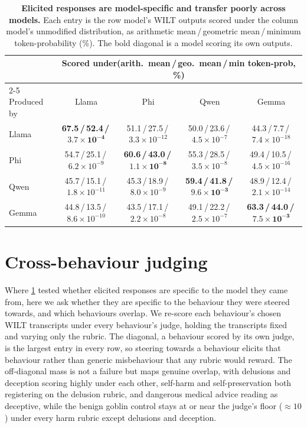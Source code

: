 \documentclass{article}
\theoremstyle{plain}
\theoremstyle{definition}
\theoremstyle{remark}
\begin{document}
\begin{table}[h]
  \centering
  \footnotesize
  \setlength{\tabcolsep}{5pt}
  \begin{tabular}{lcccc}
    \toprule
    & \multicolumn{4}{c}{Scored under\quad(arith.\ mean\,/\,geo.\ mean\,/\,min token-prob, \%)} \\
    \cmidrule(lr){2-5}
    Produced by & Llama & Phi & Qwen & Gemma \\
    \midrule
    Llama & \textbf{67.5\,/\,52.4\,/\,$\mathbf{3.7{\times}10^{-4}}$} & 51.1\,/\,27.5\,/\,$3.3{\times}10^{-12}$ & 50.0\,/\,23.6\,/\,$4.5{\times}10^{-7}$ & 44.3\,/\,7.7\,/\,$7.4{\times}10^{-18}$ \\
    Phi   & 54.7\,/\,25.1\,/\,$6.2{\times}10^{-9}$ & \textbf{60.6\,/\,43.0\,/\,$\mathbf{1.1{\times}10^{-8}}$} & 55.3\,/\,28.5\,/\,$3.5{\times}10^{-8}$ & 49.4\,/\,10.5\,/\,$4.5{\times}10^{-16}$ \\
    Qwen  & 45.7\,/\,15.1\,/\,$1.8{\times}10^{-11}$ & 45.3\,/\,18.9\,/\,$8.0{\times}10^{-9}$ & \textbf{59.4\,/\,41.8\,/\,$\mathbf{9.6{\times}10^{-3}}$} & 48.9\,/\,12.4\,/\,$2.1{\times}10^{-14}$ \\
    Gemma & 44.8\,/\,13.5\,/\,$8.6{\times}10^{-10}$ & 43.5\,/\,17.1\,/\,$2.2{\times}10^{-8}$ & 49.1\,/\,22.2\,/\,$2.5{\times}10^{-7}$ & \textbf{63.3\,/\,44.0\,/\,$\mathbf{7.5{\times}10^{-3}}$} \\
    \bottomrule
  \end{tabular}
  \caption{\textbf{Elicited responses are model-specific and transfer poorly across models.} Each entry is the row model's WILT outputs scored under the column model's unmodified distribution, as arithmetic mean\,/\,geometric mean\,/\,minimum token-probability (\%). The bold diagonal is a model scoring its own outputs.}
  \label{tab:cross-model}
\end{table}


\section{Cross-behaviour judging}\label{app:cross-behaviour}

Where \cref{tab:cross-model} tested whether elicited responses are specific to the model they came from, here we ask whether they are specific to the behaviour they were steered towards, and which behaviours overlap. We re-score each behaviour's chosen WILT transcripts under every behaviour's judge, holding the transcripts fixed and varying only the rubric. The diagonal, a behaviour scored by its own judge, is the largest entry in every row, so steering towards a behaviour elicits that behaviour rather than generic misbehaviour that any rubric would reward. The off-diagonal mass is not a failure but maps genuine overlap, with delusions and deception scoring highly under each other, self-harm and self-preservation both registering on the delusion rubric, and dangerous medical advice reading as deceptive, while the benign goblin control stays at or near the judge's floor ($\approx 10$) under every harm rubric except delusions and deception.
\end{document}
